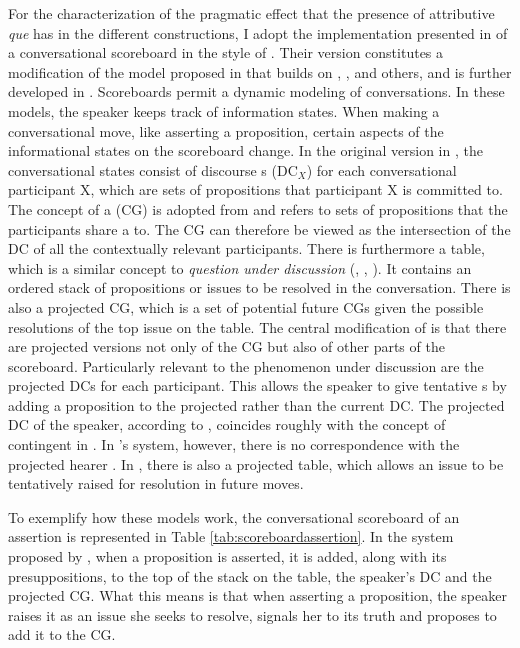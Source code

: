 For the characterization of the pragmatic effect that the presence of attributive \emph{que} has in the different constructions, I adopt the implementation  presented in \citet{Malamud2015} of a  conversational scoreboard in the style of \citet{Lewis1979}. Their version constitutes a modification of the model proposed in  \citet{Farkas2010}  that builds on \citet{Hamblin1971}, \citet{Gunlogson2003}, \citet{Ginzburg2012} and others, and is further developed in \citet{Roelofsen2015}. Scoreboards permit a dynamic  modeling of conversations.  In these models,  the speaker keeps track of information states. When making a conversational move, like asserting a proposition, certain aspects of the informational states on the scoreboard change. In the original version in \citet{Farkas2010}, the conversational states consist of  discourse s (DC$_X$) for each conversational participant X, which are sets of propositions that participant X is committed to. The concept of a  (CG) is adopted from \citet{Stalnaker1978} and refers to sets of propositions that the participants share a  to. The CG can therefore be viewed as the intersection of the DC of all the contextually relevant participants. There is furthermore a table, which is a similar concept to \emph{question under discussion} (\citealt{Ginzburg1996}, \citealt{Roberts1996}, \citealt{Engdahl2006}). It contains an ordered stack of propositions or issues to be resolved in the conversation. There is also a projected CG, which is a set of potential future CGs given the possible resolutions of the top issue on the table. 
The central modification of \citet{Malamud2015} is that  there are projected versions not only of the CG but also of other parts of the scoreboard. Particularly relevant to the  phenomenon under discussion   are the projected DCs for each participant. This  allows the speaker to give tentative s by adding a proposition to the projected rather than the current DC. The projected DC of the speaker, according to \citet{Malamud2015}, coincides roughly with the concept of contingent  in \citet{Gunlogson2008}. In \citeauthor{Gunlogson2008}'s system, however, there is no correspondence with the projected hearer . In \citet{Malamud2015}, there  is also a projected table, which allows an issue to be tentatively raised for resolution in future moves.
 
 
To exemplify how these models work, the conversational scoreboard of an assertion is represented in Table \ref{tab:scoreboardassertion}.  In the system  proposed by \citet{Malamud2015}, when  a proposition is asserted, it is added, along with its presuppositions,  to the top of the stack on the table, the speaker's DC and the projected CG. What this means is that when asserting a proposition, the speaker raises it as an issue she seeks to resolve, signals her  to its truth and proposes to add it to the CG. 

